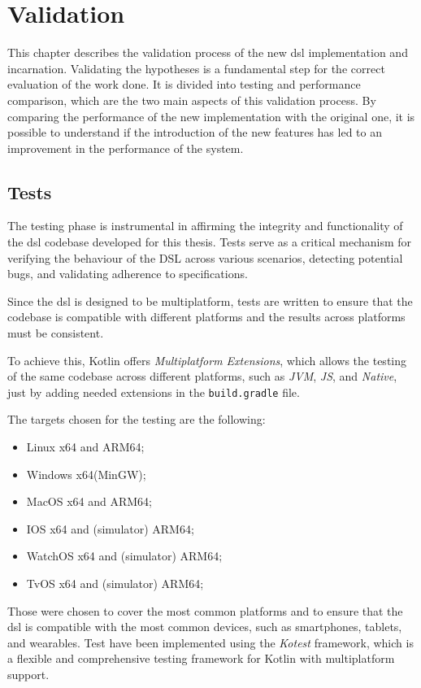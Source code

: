 
\chapter{Validation}
\label{ch:validation}
This chapter describes the validation process of the new \ac{dsl} implementation and incarnation.
Validating the hypotheses is a fundamental step for the correct evaluation of the work done.
It is divided into testing and performance comparison, which are the two main aspects of this validation process.
By comparing the performance of the new implementation with the original one, it is possible to understand if the
introduction of the new features has led to an improvement in the performance of the system.

\section{Tests}
\label{sec:tests}
The testing phase is instrumental in affirming the integrity and functionality of the \ac{dsl} codebase developed for this thesis.
Tests serve as a critical mechanism for verifying the behaviour of the DSL across various scenarios, detecting potential bugs,
and validating adherence to specifications.

Since the \ac{dsl} is designed to be multiplatform, tests are written to ensure that the codebase is compatible with
different platforms and the results across platforms must be consistent.

To achieve this, Kotlin offers \emph{Multiplatform Extensions}, which allows the testing of the same codebase across
different platforms, such as \emph{JVM}, \emph{JS}, and \emph{Native}, just by adding needed extensions in the \texttt{build.gradle} file.

The targets chosen for the testing are the following:
\begin{itemize}
    \item Linux x64 and ARM64;
    \item Windows x64(MinGW);
    \item MacOS x64 and ARM64;
    \item IOS x64 and (simulator) ARM64;
    \item WatchOS x64 and (simulator) ARM64;
    \item TvOS x64 and (simulator) ARM64;
\end{itemize}

Those were chosen to cover the most common platforms and to ensure that the \ac{dsl} is compatible with the most common
devices, such as smartphones, tablets, and wearables.
Test have been implemented using the \emph{Kotest} framework, which is a flexible and comprehensive testing framework for Kotlin
with multiplatform support.

